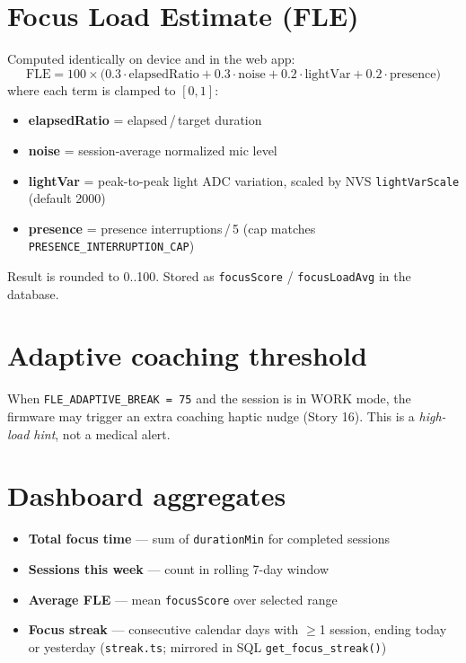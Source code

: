\documentclass[11pt,a4paper]{report}
\newcommand{\filepath}[1]{\texttt{#1}}
\begin{document}
\section{Focus Load Estimate (FLE)}

Computed identically on device and in the web app:
\begin{equation}
  \mathrm{FLE} = 100 \times \bigl(
    0.3 \cdot \mathrm{elapsedRatio}
  + 0.3 \cdot \mathrm{noise}
  + 0.2 \cdot \mathrm{lightVar}
  + 0.2 \cdot \mathrm{presence}
  \bigr)
\end{equation}
where each term is clamped to $[0,1]$:
\begin{itemize}[leftmargin=*]
  \item \textbf{elapsedRatio} = elapsed\,/\,target duration
  \item \textbf{noise} = session-average normalized mic level
  \item \textbf{lightVar} = peak-to-peak light ADC variation, scaled by NVS
        \texttt{lightVarScale} (default 2000)
  \item \textbf{presence} = presence interruptions\,/\,5 (cap matches \texttt{PRESENCE\_INTERRUPTION\_CAP})
\end{itemize}
Result is rounded to 0..100. Stored as \texttt{focusScore} / \texttt{focusLoadAvg} in the database.

\section{Adaptive coaching threshold}

When \texttt{FLE\_ADAPTIVE\_BREAK = 75} and the session is in WORK mode, the firmware may
trigger an extra coaching haptic nudge (Story 16). This is a \emph{high-load hint}, not a
medical alert.

\section{Dashboard aggregates}

\begin{itemize}[leftmargin=*]
  \item \textbf{Total focus time} --- sum of \texttt{durationMin} for completed sessions
  \item \textbf{Sessions this week} --- count in rolling 7-day window
  \item \textbf{Average FLE} --- mean \texttt{focusScore} over selected range
  \item \textbf{Focus streak} --- consecutive calendar days with $\geq$1 session, ending
        today or yesterday (\filepath{streak.ts}; mirrored in SQL \texttt{get\_focus\_streak()})
\end{itemize}
\end{document}
